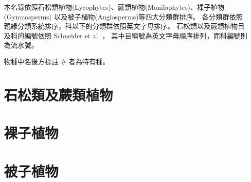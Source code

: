 本名錄依照石松類植物(Lycophytes)、蕨類植物(Monilophytes)、裸子植物(Gymnosperms)
以及被子植物(Angiosperms)等四大分類群排序。
各分類群依照親緣分類系統排序，科以下的分類群依照英文字母排序。
石松類以及蕨類植物目及科的編號依照 Schneider et al. \citeyearpar{Schneider:2016hr}，
其中目編號為英文字母順序排列，而科編號則為流水號。

物種中名後方標註 \# 者為特有種。\\
\begin{multicols}{2}
\section{石松類及蕨類植物}

\section{裸子植物}
%
\section{被子植物}

\end{multicols}
